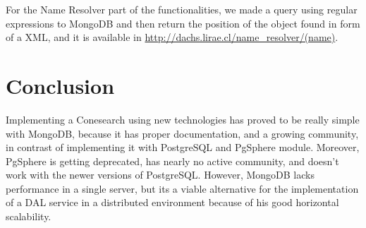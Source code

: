\documentclass[11pt,twoside]{article}
\begin{document}
  For the Name Resolver part of the functionalities, we made a query using regular expressions to MongoDB and then return the position
  of the object found in form of a XML, and it is available in \url{http://dachs.lirae.cl/name_resolver/(name)}.

\section{Conclusion}
    Implementing a Conesearch using new technologies has proved to be really
simple with MongoDB, because it has proper documentation, 
and a growing community, in contrast of implementing it with PostgreSQL and
PgSphere module. Moreover,  PgSphere is getting deprecated, has nearly no active
community, and doesn't work with the newer versions of PostgreSQL. 
However,  MongoDB lacks performance in a single server, but its a viable alternative
for the implementation of a DAL service in a distributed environment because of his good horizontal scalability.



\end{document}
